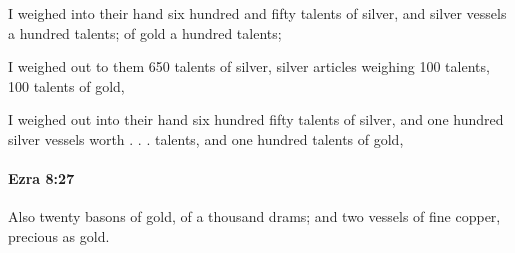 			\begin{versebox}
					\item[BHS] 
					\item[LXX] 
					\item[ASV] I weighed into their hand six hundred and fifty talents of silver, and silver vessels a hundred talents; of gold a hundred talents;
					\item[NIV] I weighed out to them 650 talents of silver, silver articles weighing 100 talents, 100 talents of gold,
					\item[NRSV] I weighed out into their hand six hundred fifty talents of silver, and one hundred silver vessels worth . . . talents, and one hundred talents of gold,
			\end{versebox}

		\paragraph{Ezra 8:27} %
			\label{EZRA-8-27}

			Also twenty basons of gold, of a thousand drams; and two vessels of fine copper, precious as gold.

